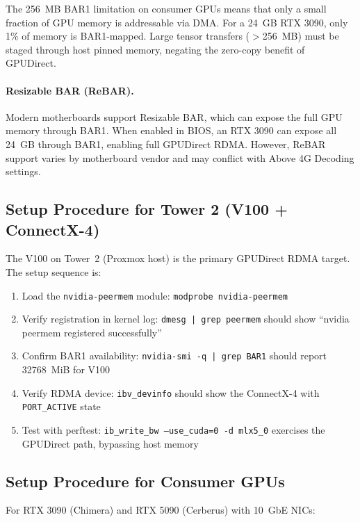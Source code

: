 \documentclass[11pt,letterpaper]{article}
\begin{document}
The 256~MB BAR1 limitation on consumer GPUs means that only a small fraction of GPU memory is addressable via DMA. For a 24~GB RTX 3090, only 1\% of memory is BAR1-mapped. Large tensor transfers ($>$256~MB) must be staged through host pinned memory, negating the zero-copy benefit of GPUDirect.

\paragraph{Resizable BAR (ReBAR).}
Modern motherboards support Resizable BAR, which can expose the full GPU memory through BAR1. When enabled in BIOS, an RTX 3090 can expose all 24~GB through BAR1, enabling full GPUDirect RDMA. However, ReBAR support varies by motherboard vendor and may conflict with Above 4G Decoding settings.

\subsection{Setup Procedure for Tower 2 (V100 + ConnectX-4)}

The V100 on Tower~2 (Proxmox host) is the primary GPUDirect RDMA target. The setup sequence is:

\begin{enumerate}[noitemsep]
    \item Load the \texttt{nvidia-peermem} module: \texttt{modprobe nvidia-peermem}
    \item Verify registration in kernel log: \texttt{dmesg | grep peermem} should show ``nvidia peermem registered successfully''
    \item Confirm BAR1 availability: \texttt{nvidia-smi -q | grep BAR1} should report 32768~MiB for V100
    \item Verify RDMA device: \texttt{ibv\_devinfo} should show the ConnectX-4 with \texttt{PORT\_ACTIVE} state
    \item Test with perftest: \texttt{ib\_write\_bw --use\_cuda=0 -d mlx5\_0} exercises the GPUDirect path, bypassing host memory
\end{enumerate}

\subsection{Setup Procedure for Consumer GPUs}

For RTX 3090 (Chimera) and RTX 5090 (Cerberus) with 10~GbE NICs:
\end{document}
